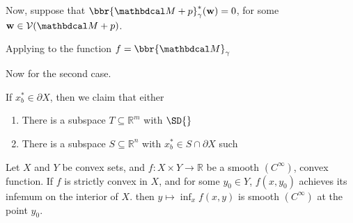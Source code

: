 \documentclass[twoside]{article}
\begin{document}
\begin{lproof}
	Now, suppose that $\bbr{\dg M \bundle p}_\gamma^*(\mat w) = 0$,  for some $\mat w \in \V(\dg M \bundle p)$.

	Applying  to the function $f = \bbr{\dg M}_\gamma$

	Now for the second case.

	\TODO

	If $x^*_b \in \partial X$, then we claim that either
	\begin{enumerate}[nosep]
		\item There is a subspace $T \subseteq \mathbb R^{m}$ with
			$\SD{}$
	 	\item There is a subspace $S \subseteq \mathbb R^{n}$ with
			$x^*_b \in S \cap \partial X$ such

	\end{enumerate}

\end{lproof}

\begin{lemma}\label{lem:cvx4}
	Let $X$ and $Y$ be convex sets, and
	$f : X \times Y \to \mathbb R$ be a smooth $(C^\infty)$, convex function.
	If $f$ is strictly convex in $X$, and for some $y_0 \in Y$, $f(x, y_0)$ achieves its infemum on the interior of $X$.
	then $y\mapsto \inf_x f(x, y)$ is smooth $(C^\infty)$ at the point $y_0$.
\end{lemma}
\end{document}
